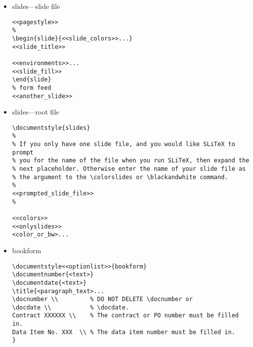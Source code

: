 \begin{itemize}
\begin{small}
\begin{verbatim}
<<environments>>...

\closing{<paragraph_text>...}
<<cc>>
<<encl>>
<<ps>>
\end{letter}

\end{verbatim}
\end{small}

\item slides---slide file

\begin{small}
\begin{verbatim}
<<pagestyle>>
%
\begin{slide}{<<slide_colors>>...}
<<slide_title>>

<<environments>>...
<<slide_fill>>
\end{slide}
% form feed
<<another_slide>>
\end{verbatim}
\end{small}

\item slides---root file

\begin{small}
\begin{verbatim}
\documentstyle{slides}
%
% If you only have one slide file, and you would like SLiTeX to prompt
% you for the name of the file when you run SLiTeX, then expand the
% next placeholder. Otherwise enter the name of your slide file as
% the argument to the \colorslides or \blackandwhite command.
%
<<prompted_slide_file>>
%

<<colors>>
<<onlyslides>>
<color_or_bw>...

\end{verbatim}
\end{small}

\newpage

\item bookform

\begin{small}
\begin{verbatim}
\documentstyle<<optionlist>>{bookform}
\documentnumber{<text>}
\documentdate{<text>}
\title{<paragraph_text>...
\docnumber \\         % DO NOT DELETE \docnumber or
\docdate \\           % \docdate.
Contract XXXXXX \\    % The contract or PO number must be filled in.
Data Item No. XXX  \\ % The data item number must be filled in.
}




\end{verbatim}
\end{small}
\end{itemize}
